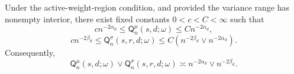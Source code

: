 Under the active-weight-region condition, and provided the variance range has nonempty interior, there exist fixed constants \(0<c<C<\infty\) such that
\[
c n^{-2\alpha_d}\leq\mathsf Q_n^{\mu}(s,d;\omega)\leq C n^{-2\alpha_d},
\]
\[
c n^{-2\beta_d}\leq\mathsf Q_n^{\sigma}(s,r,d;\omega)
\leq C\left(n^{-2\beta_d}\vee n^{-2\alpha_d}\right).
\]
Consequently,
\[
\mathsf Q_n^{\mu}(s,d;\omega)\vee\mathsf Q_n^{\sigma}(s,r,d;\omega)
\asymp n^{-2\alpha_d}\vee n^{-2\beta_d}.
\]
